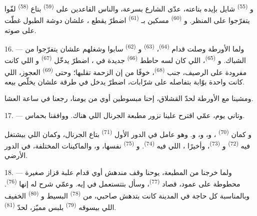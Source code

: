 و \textsuperscript{(55)} شايل بإيده  بتاعته،
عدّى الشارع بسرعة، والناس القاعدين على  \textsuperscript{(59)}
بتاع  \textsuperscript{(58)} لفّوا يتفرّجوا على المنظر.
و \textsuperscript{(60)} مسكين بـ
\textsuperscript{(61)} اضطرّ يقطع ، علشان دوشة الطبول غطّت على صوته.

16. --- ولما الأورطة وصلت قدام  \textsuperscript{(64)}،
 \textsuperscript{(63)} و \textsuperscript{(62)} سابوا
 وشغلهم علشان يتفرّجوا من الشباك. و
\textsuperscript{(65)}، اللي كان لسه حاطط  \textsuperscript{(66)} جديدة في
، اضطرّ يدخّل  \textsuperscript{(67)}
و اللي كانت مفرودة على الرصيف، جنب 
\textsuperscript{(68)}، خوفًا من إن الزحمة تقلبها؛ وحتى 
\textsuperscript{(69)} العجوز، اللي كانت واحدة بوّابة بتفاصله على شرّابات، اضطرّ يدخل
في طرقة علشان يخلّص بيعه.

ومشينا مع الأورطة لحدّ القشلاق، إحنا مبسوطين أوي من يومنا، رجعنا في
ساعة العشا.

\VUsaut{3.0mm}

17. --- وتاني يوم، عمّي اقترح علينا نزور مطبعة الجرنال اللي هناك. ووافقنا بحماس.

و كمان  \textsuperscript{(70)} ، و، و، و. وهو عامل في الدور الأول
 \textsuperscript{(71)} بتاع الجرنال، وكمان  اللي
بيشتغل فيه  \textsuperscript{(72)} و \textsuperscript{(73)}، وأخيرًا ، اللي فيه  \textsuperscript{(74)}. و \textsuperscript{(75)} نفسها،
و، والماكينات المختلفة، في الدور الأرضي.

\VUsaut{3.0mm}

18. --- ولما خرجنا من المطبعة، يوحنا وقف مندهش أوي قدام علبة قزاز صغيرة محطوطة
على عمود، قصاد  \textsuperscript{(77)}، وسأل بتتستعمل في إيه.
وعمّي شرح له إنها  \textsuperscript{(76)}. وبالمناسبة كل حاجة في
المدينة كانت بتدهش صاحبي، من  \textsuperscript{(78)} البسيط
و \textsuperscript{(80)} الخفيف اللي بيسوقه 
\textsuperscript{(79)} بلبس مميّز، لحدّ  \textsuperscript{(81)}.


